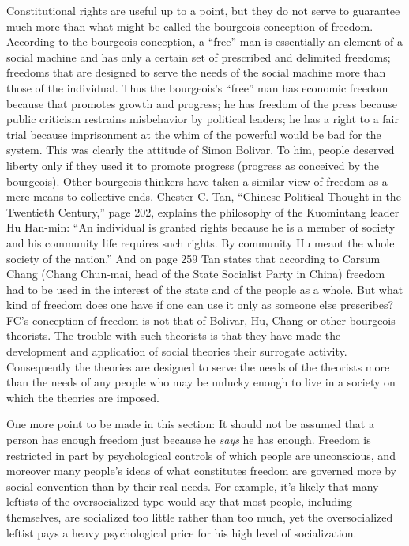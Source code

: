  Constitutional rights are useful up to a point, but they do not serve to guarantee much more than what might be called the bourgeois conception of freedom. According to the bourgeois conception, a “free” man is essentially an element of a social machine and has only a certain set of prescribed and delimited freedoms; freedoms that are designed to serve the needs of the social machine more than those of the individual. Thus the bourgeois’s “free” man has economic freedom because that promotes growth and progress; he has freedom of the press because public criticism restrains misbehavior by political leaders; he has a right to a fair trial because imprisonment at the whim of the powerful would be bad for the system. This was clearly the attitude of Simon Bolivar. To him, people deserved liberty only if they used it to promote progress (progress as conceived by the bourgeois). Other bourgeois thinkers have taken a similar view of freedom as a mere means to collective ends. Chester C. Tan, “Chinese Political Thought in the Twentieth Century,” page 202, explains the philosophy of the Kuomintang leader Hu Han-min: “An individual is granted rights because he is a member of society and his community life requires such rights. By community Hu meant the whole society of the nation.” And on page 259 Tan states that according to Carsum Chang (Chang Chun-mai, head of the State Socialist Party in China) freedom had to be used in the interest of the state and of the people as a whole. But what kind of freedom does one have if one can use it only as someone else prescribes? FC’s conception of freedom is not that of Bolivar, Hu, Chang or other bourgeois theorists. The trouble with such theorists is that they have made the development and application of social theories their surrogate activity. Consequently the theories are designed to serve the needs of the theorists more than the needs of any people who may be unlucky enough to live in a society on which the theories are imposed.

 One more point to be made in this section: It should not be assumed that a person has enough freedom just because he {\em says} he has enough. Freedom is restricted in part by psychological controls of which people are unconscious, and moreover many people’s ideas of what constitutes freedom are governed more by social convention than by their real needs. For example, it’s likely that many leftists of the oversocialized type would say that most people, including themselves, are socialized too little rather than too much, yet the oversocialized leftist pays a heavy psychological price for his high level of socialization.

